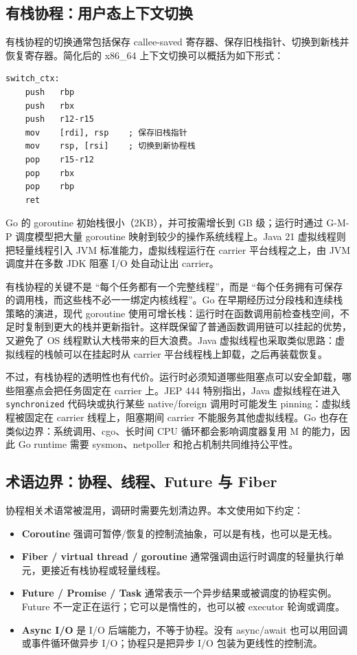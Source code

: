 \documentclass[UTF8,a4paper,12pt]{ctexart}
\begin{document}
\subsection{有栈协程：用户态上下文切换}

有栈协程的切换通常包括保存 callee-saved 寄存器、保存旧栈指针、切换到新栈并恢复寄存器。简化后的 x86\_64 上下文切换可以概括为如下形式：

\begin{lstlisting}[language={[x86masm]Assembler},caption={有栈协程上下文切换示意}]
switch_ctx:
    push   rbp
    push   rbx
    push   r12-r15
    mov    [rdi], rsp    ; 保存旧栈指针
    mov    rsp, [rsi]    ; 切换到新协程栈
    pop    r15-r12
    pop    rbx
    pop    rbp
    ret
\end{lstlisting}

Go 的 goroutine 初始栈很小（2KB），并可按需增长到 GB 级；运行时通过 G-M-P 调度模型把大量 goroutine 映射到较少的操作系统线程上。Java 21 虚拟线程则把轻量线程引入 JVM 标准能力，虚拟线程运行在 carrier 平台线程之上，由 JVM 调度并在多数 JDK 阻塞 I/O 处自动让出 carrier\cite{jep444}。

有栈协程的关键不是 ``每个任务都有一个完整线程''，而是 ``每个任务拥有可保存的调用栈，而这些栈不必一一绑定内核线程''。Go 在早期经历过分段栈和连续栈策略的演进，现代 goroutine 使用可增长栈：运行时在函数调用前检查栈空间，不足时复制到更大的栈并更新指针。这样既保留了普通函数调用链可以挂起的优势，又避免了 OS 线程默认大栈带来的巨大浪费。Java 虚拟线程也采取类似思路：虚拟线程的栈帧可以在挂起时从 carrier 平台线程栈上卸载，之后再装载恢复。

不过，有栈协程的透明性也有代价。运行时必须知道哪些阻塞点可以安全卸载，哪些阻塞点会把任务固定在 carrier 上。JEP 444 特别指出，Java 虚拟线程在进入 \verb|synchronized| 代码块或执行某些 native/foreign 调用时可能发生 pinning：虚拟线程被固定在 carrier 线程上，阻塞期间 carrier 不能服务其他虚拟线程\cite{jep444}。Go 也存在类似边界：系统调用、cgo、长时间 CPU 循环都会影响调度器复用 M 的能力，因此 Go runtime 需要 sysmon、netpoller 和抢占机制共同维持公平性。

\subsection{术语边界：协程、线程、Future 与 Fiber}

协程相关术语常被混用，调研时需要先划清边界。本文使用如下约定：

\begin{itemize}
  \item \textbf{Coroutine} 强调可暂停/恢复的控制流抽象，可以是有栈，也可以是无栈。
  \item \textbf{Fiber / virtual thread / goroutine} 通常强调由运行时调度的轻量执行单元，更接近有栈协程或轻量线程。
  \item \textbf{Future / Promise / Task} 通常表示一个异步结果或被调度的协程实例。Future 不一定正在运行；它可以是惰性的，也可以被 executor 轮询或调度。
  \item \textbf{Async I/O} 是 I/O 后端能力，不等于协程。没有 async/await 也可以用回调或事件循环做异步 I/O；协程只是把异步 I/O 包装为更线性的控制流。
\end{itemize}
\end{document}

